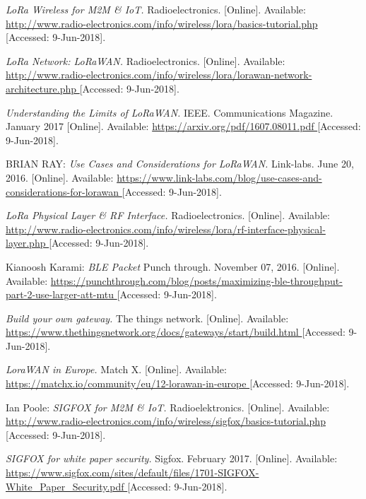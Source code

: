 \begin{thebibliography}{9}

\textit{
LoRa Wireless for M2M \& IoT.
}
Radioelectronics.
[Online]. Available:
\url{
http://www.radio-electronics.com/info/wireless/lora/basics-tutorial.php
}
[Accessed: 9-Jun-2018].

\textit{
LoRa Network: LoRaWAN.
}
Radioelectronics.
[Online]. Available:
\url{
http://www.radio-electronics.com/info/wireless/lora/lorawan-network-architecture.php
}
[Accessed: 9-Jun-2018].

\textit{
Understanding the Limits of LoRaWAN.
} IEEE.
Communications Magazine. January 2017
[Online]. Available:
\url{
https://arxiv.org/pdf/1607.08011.pdf
}
[Accessed: 9-Jun-2018].

BRIAN RAY: 
\textit{
Use Cases and Considerations for LoRaWAN.
}
Link-labs. June 20, 2016.
[Online]. Available:
\url{
https://www.link-labs.com/blog/use-cases-and-considerations-for-lorawan
}
[Accessed: 9-Jun-2018].

\textit{
LoRa Physical Layer \& RF Interface.
}
Radioelectronics.
[Online]. Available:
\url{
http://www.radio-electronics.com/info/wireless/lora/rf-interface-physical-layer.php
}
[Accessed: 9-Jun-2018].

Kianoosh Karami: 
\textit{
BLE Packet
}
Punch through. November 07, 2016.
[Online]. Available:
\url{
https://punchthrough.com/blog/posts/maximizing-ble-throughput-part-2-use-larger-att-mtu
}
[Accessed: 9-Jun-2018].

\textit{
Build your own gateway.
}
The things network.
[Online]. Available:
\url{
https://www.thethingsnetwork.org/docs/gateways/start/build.html
}
[Accessed: 9-Jun-2018].

\textit{
LoraWAN in Europe.
}
Match X.
[Online]. Available:
\url{
https://matchx.io/community/eu/12-lorawan-in-europe
}
[Accessed: 9-Jun-2018].


Ian Poole: 
\textit{
SIGFOX for M2M \& IoT.
}
Radioelektronics.
[Online]. Available:
\url{
http://www.radio-electronics.com/info/wireless/sigfox/basics-tutorial.php
}
[Accessed: 9-Jun-2018].

\textit{
SIGFOX for white paper security.
}
Sigfox. February 2017.
[Online]. Available:
\url{
https://www.sigfox.com/sites/default/files/1701-SIGFOX-White_Paper_Security.pdf
}
[Accessed: 9-Jun-2018].


\end{thebibliography}
